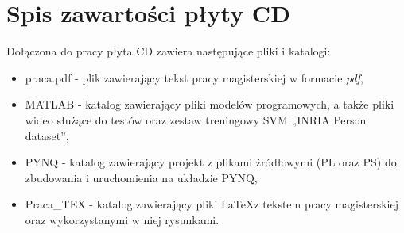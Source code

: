 \renewcommand{\thechapter}{\Alph{chapter}}
\chapter{Spis zawartości płyty CD}

Dołączona do pracy płyta CD zawiera następujące pliki i katalogi:
\begin{itemize}
	\item praca.pdf - plik zawierający tekst pracy magisterskiej w formacie \textit{pdf},
	\item MATLAB - katalog zawierający pliki modelów programowych, a także pliki wideo służące do testów oraz zestaw treningowy SVM „INRIA Person dataset”,
	\item PYNQ - katalog zawierający projekt z plikami źródłowymi (PL oraz PS) do zbudowania i uruchomienia na układzie PYNQ,
	\item Praca\_TEX - katalog zawierający pliki \LaTeX z tekstem pracy magisterskiej oraz wykorzystanymi w niej rysunkami.
\end{itemize}